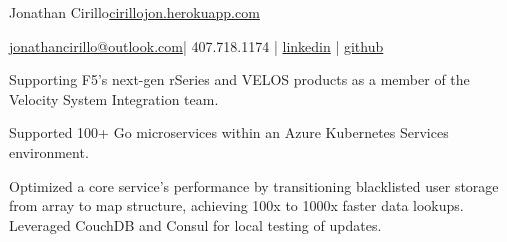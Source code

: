 \documentclass[]{deedy-resume-openfont}
\begin{document}
%
%


\namesection \LARGE {{Jonathan} {Cirillo}}{\href{https://cirillojon.herokuapp.com/}{cirillojon.herokuapp.com}}

\vspace{18pt}

\newcommand{\linkedin}[1]{\faLinkedin\hspace{0.5em}\href{https://linkedin.com/in/#1}{\texttt{#1}}}
\newcommand{\github}[1]{\faGithub\hspace{0.5em}\href{https://github.com/#1}{\texttt{#1}}}

{\FA \faEnvelope} {\href{mailto:jonathancirillo@outlook.com}{jonathancirillo@outlook.com}}\hspace{5pt}|\hspace{5pt}{\FA \faPhone} 407.718.1174 |\hspace{5pt} {\FA \faLinkedin} {\href{https://linkedin.com/in/jonathan-cirillo/}{linkedin}} \hspace{5pt}|\hspace{5pt} {\FA \faGithub} {\href{https://github.com/cirillojon}{github}}


\vspace{6pt}



\hspace{1cm}
\begin{tightemize}
\item Supporting F5's next-gen rSeries and VELOS products as a member of the Velocity System Integration team.
\end{tightemize}
\sectionsep


\hspace{1cm}
\begin{tightemize}
\item Supported 100+ Go microservices within an Azure Kubernetes Services environment.
\item Optimized a core service’s performance by transitioning blacklisted user storage from array to map structure, achieving 100x to 1000x faster data lookups. Leveraged CouchDB and Consul for local testing of updates.
\end{tightemize}
\sectionsep
\end{document}

